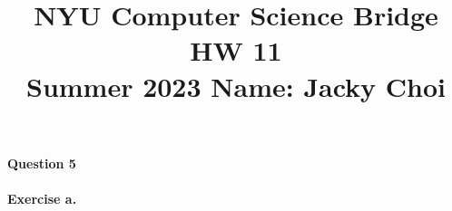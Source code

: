 \documentclass{article}
\title{\textbf{NYU Computer Science Bridge HW 11}\\
Summer 2023 Name: Jacky Choi}
\date{}
\begin{document}
\setul{}{2pt}
\maketitle

\noindent \textbf{Question 5}\\\\
\textbf{Exercise  a.}\\
\end{document}
